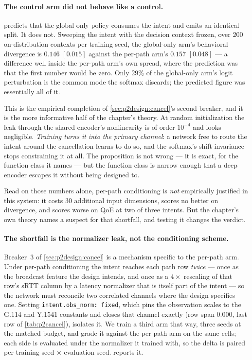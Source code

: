 \paragraph{The control arm did not behave like a control.}  predicts that the
global-only policy consumes the intent and emits an identical split. It does not. Sweeping the intent
with the decision context frozen, over 200 on-distribution contexts per training seed, the global-only
arm's behavioral divergence is $0.146$ $[0.015]$ against the per-path arm's $0.157$ $[0.048]$ --- a
difference well inside the per-path arm's own spread, where the prediction was that the first number
would be zero. Only 29\% of the global-only arm's logit perturbation is the common mode the softmax
discards; the predicted figure was essentially all of it.

This is the empirical completion of \cref{sec:p2design:cancel}'s second breaker, and it is the more
informative half of the chapter's theory. At random initialization the leak through the shared encoder's
nonlinearity is of order $10^{-4}$ and looks negligible. \emph{Training turns it into the primary
channel}: a network free to route the intent around the cancellation learns to do so, and the softmax's
shift-invariance stops constraining it at all. The proposition is not wrong --- it is exact, for the
function class it names --- but the function class is narrow enough that a deep encoder escapes it
without being designed to.

Read on those numbers alone, per-path conditioning is \emph{not} empirically justified in this system:
it costs 30 additional input dimensions, scores no better on divergence, and scores worse on QoE at two
of three intents. But the chapter's own theory names a suspect for that shortfall, and testing it
changes the verdict.

\paragraph{The shortfall is the normalizer leak, not the conditioning scheme.} Breaker~3 of
\cref{sec:p2design:cancel} is a mechanism specific to the per-path arm. Under per-path conditioning the
intent reaches each path row \emph{twice} --- once as the broadcast feature the design intends, and once
as a $4\times$ rescaling of that row's sRTT column by a latency normalizer that is itself part of the
intent --- so the network must reconcile two correlated channels where the design specifies one. Setting
\texttt{intent.obs\_norm: fixed}, which pins the observation scales to the G.114 and Y.1541 constants and
closes that channel exactly (row span 0.000, last row of \cref{tab:p2cancel}), isolates it. We train a
third arm that way, three seeds at the matched budget, and grade it against the per-path arm on the same
cells; each side is evaluated under the normalizer it trained with, so the delta is paired per training
seed $\times$ evaluation seed.  reports it.

